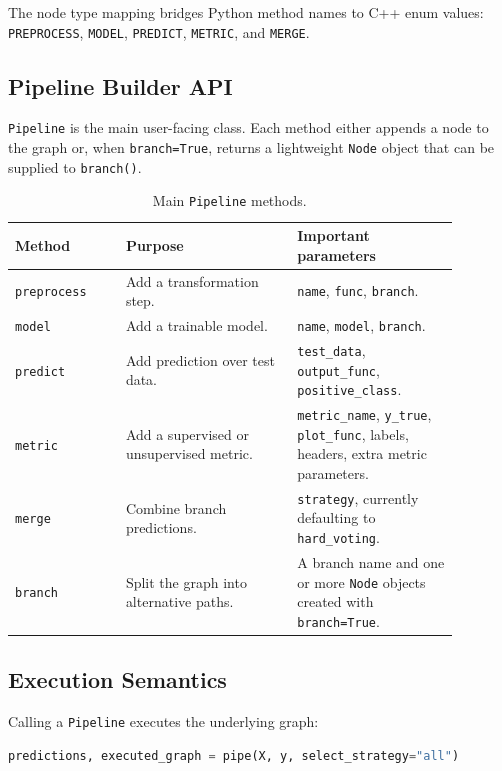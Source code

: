 \documentclass[11pt,a4paper]{article}
\begin{document}
The node type mapping bridges Python method names to C++ enum values:
\texttt{PREPROCESS}, \texttt{MODEL}, \texttt{PREDICT}, \texttt{METRIC}, and
\texttt{MERGE}.

\subsection{Pipeline Builder API}

\texttt{Pipeline} is the main user-facing class. Each method either appends a
node to the graph or, when \texttt{branch=True}, returns a lightweight
\texttt{Node} object that can be supplied to \texttt{branch()}.

\begin{table}[H]
\centering
\caption{Main \texttt{Pipeline} methods.}
\begin{tabular}{p{0.22\linewidth}p{0.34\linewidth}p{0.32\linewidth}}
\toprule
\textbf{Method} & \textbf{Purpose} & \textbf{Important parameters}\\
\midrule
\texttt{preprocess} & Add a transformation step. & \texttt{name},
\texttt{func}, \texttt{branch}.\\
\texttt{model} & Add a trainable model. & \texttt{name}, \texttt{model},
\texttt{branch}.\\
\texttt{predict} & Add prediction over test data. & \texttt{test\_data},
\texttt{output\_func}, \texttt{positive\_class}.\\
\texttt{metric} & Add a supervised or unsupervised metric. &
\texttt{metric\_name}, \texttt{y\_true}, \texttt{plot\_func}, labels,
headers, extra metric parameters.\\
\texttt{merge} & Combine branch predictions. & \texttt{strategy}, currently
defaulting to \texttt{hard\_voting}.\\
\texttt{branch} & Split the graph into alternative paths. & A branch name and
one or more \texttt{Node} objects created with \texttt{branch=True}.\\
\bottomrule
\end{tabular}
\end{table}

\subsection{Execution Semantics}

Calling a \texttt{Pipeline} executes the underlying graph:

\begin{lstlisting}[language=Python]
predictions, executed_graph = pipe(X, y, select_strategy="all")
\end{lstlisting}
\end{document}
